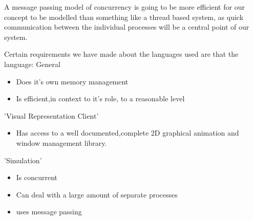 \documentclass[a4paper,12pt]{article}
\begin{document}
A message passing model of concurrency is going to be more efficient for our concept to be modelled than something like a thread based system, as quick communication between the individual processes will be a central point of our system.

Certain requirements we have made about the languages used are that the language:
General
\begin{itemize}
\item Does it's own memory management
\item Is efficient,in context to it's role, to a reasonable level 
\end{itemize}
'Visual Representation Client'
\begin{itemize}
\item Has access to a well documented,complete 2D graphical animation and window management library.
\end{itemize}
'Simulation'
\begin{itemize}
\item Is concurrent
\item Can deal with a large amount of separate processes
\item uses message passing
\end{itemize}
\end{document}
